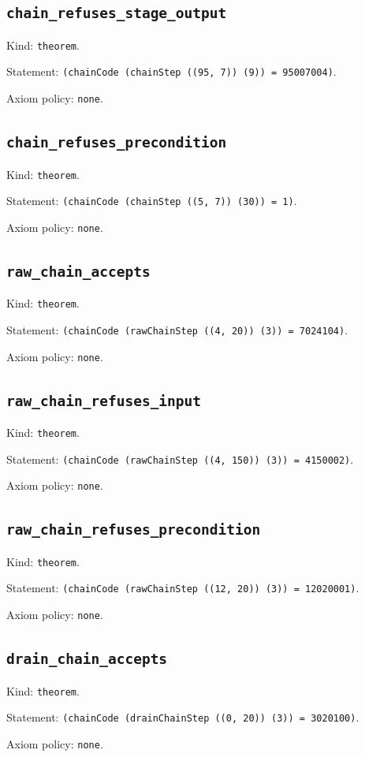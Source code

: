 \documentclass[11pt]{article}
\begin{document}
\subsection*{\texttt{chain\_refuses\_stage\_output}}
\noindent Kind: \texttt{theorem}.\par
\noindent Statement: \texttt{(chainCode (chainStep ((95, 7)) (9)) = 95007004)}.\par
\noindent Axiom policy: \texttt{none}.\par
\subsection*{\texttt{chain\_refuses\_precondition}}
\noindent Kind: \texttt{theorem}.\par
\noindent Statement: \texttt{(chainCode (chainStep ((5, 7)) (30)) = 1)}.\par
\noindent Axiom policy: \texttt{none}.\par
\subsection*{\texttt{raw\_chain\_accepts}}
\noindent Kind: \texttt{theorem}.\par
\noindent Statement: \texttt{(chainCode (rawChainStep ((4, 20)) (3)) = 7024104)}.\par
\noindent Axiom policy: \texttt{none}.\par
\subsection*{\texttt{raw\_chain\_refuses\_input}}
\noindent Kind: \texttt{theorem}.\par
\noindent Statement: \texttt{(chainCode (rawChainStep ((4, 150)) (3)) = 4150002)}.\par
\noindent Axiom policy: \texttt{none}.\par
\subsection*{\texttt{raw\_chain\_refuses\_precondition}}
\noindent Kind: \texttt{theorem}.\par
\noindent Statement: \texttt{(chainCode (rawChainStep ((12, 20)) (3)) = 12020001)}.\par
\noindent Axiom policy: \texttt{none}.\par
\subsection*{\texttt{drain\_chain\_accepts}}
\noindent Kind: \texttt{theorem}.\par
\noindent Statement: \texttt{(chainCode (drainChainStep ((0, 20)) (3)) = 3020100)}.\par
\noindent Axiom policy: \texttt{none}.\par
\end{document}
